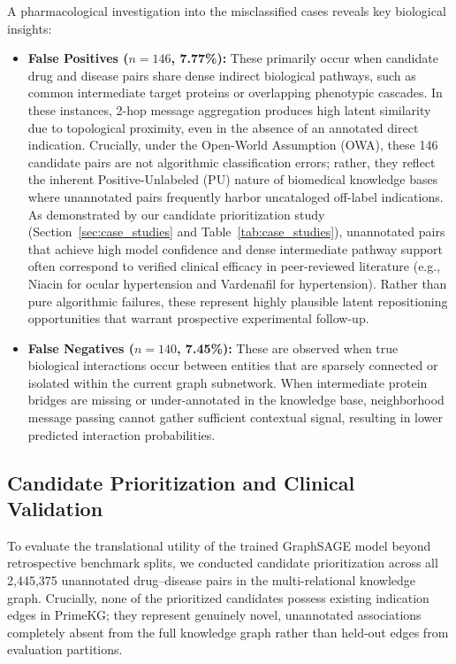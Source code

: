\documentclass[preprint,12pt]{elsarticle}
\begin{document}
A pharmacological investigation into the misclassified cases reveals key biological insights:
\begin{itemize}
    \item \textbf{False Positives ($n=146$, 7.77\%):} These primarily occur when candidate drug and disease pairs share dense indirect biological pathways, such as common intermediate target proteins or overlapping phenotypic cascades. In these instances, 2-hop message aggregation produces high latent similarity due to topological proximity, even in the absence of an annotated direct indication. Crucially, under the Open-World Assumption (OWA), these 146 candidate pairs are not algorithmic classification errors; rather, they reflect the inherent Positive-Unlabeled (PU) nature of biomedical knowledge bases where unannotated pairs frequently harbor uncataloged off-label indications. As demonstrated by our candidate prioritization study (Section~\ref{sec:case_studies} and Table~\ref{tab:case_studies}), unannotated pairs that achieve high model confidence and dense intermediate pathway support often correspond to verified clinical efficacy in peer-reviewed literature (e.g., Niacin for ocular hypertension and Vardenafil for hypertension). Rather than pure algorithmic failures, these represent highly plausible latent repositioning opportunities that warrant prospective experimental follow-up.
    \item \textbf{False Negatives ($n=140$, 7.45\%):} These are observed when true biological interactions occur between entities that are sparsely connected or isolated within the current graph subnetwork. When intermediate protein bridges are missing or under-annotated in the knowledge base, neighborhood message passing cannot gather sufficient contextual signal, resulting in lower predicted interaction probabilities.
\end{itemize}

\subsection{Candidate Prioritization and Clinical Validation}
To evaluate the translational utility of the trained GraphSAGE model beyond retrospective benchmark splits, we conducted candidate prioritization across all 2,445,375 unannotated drug--disease pairs in the multi-relational knowledge graph. Crucially, none of the prioritized candidates possess existing indication edges in PrimeKG; they represent genuinely novel, unannotated associations completely absent from the full knowledge graph rather than held-out edges from evaluation partitions. 
\end{document}
